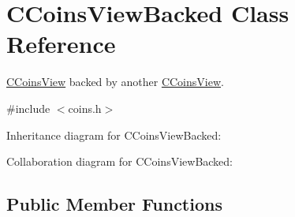 \hypertarget{class_c_coins_view_backed}{}\section{C\+Coins\+View\+Backed Class Reference}
\label{class_c_coins_view_backed}


\hyperlink{class_c_coins_view}{C\+Coins\+View} backed by another \hyperlink{class_c_coins_view}{C\+Coins\+View}.  




{\ttfamily \#include $<$coins.\+h$>$}



Inheritance diagram for C\+Coins\+View\+Backed\+:


Collaboration diagram for C\+Coins\+View\+Backed\+:
\subsection*{Public Member Functions}
